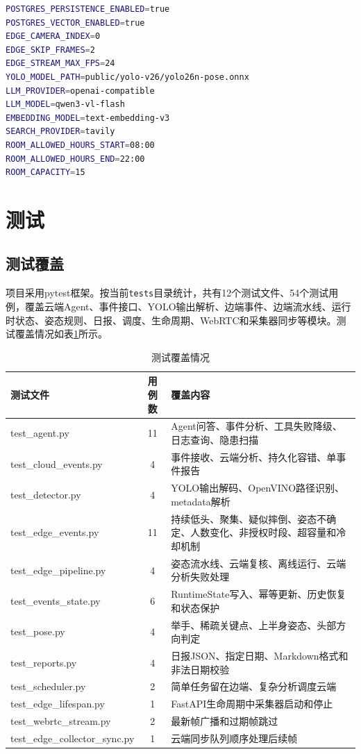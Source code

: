 \begin{lstlisting}[language=bash]
POSTGRES_PERSISTENCE_ENABLED=true
POSTGRES_VECTOR_ENABLED=true
EDGE_CAMERA_INDEX=0
EDGE_SKIP_FRAMES=2
EDGE_STREAM_MAX_FPS=24
YOLO_MODEL_PATH=public/yolo-v26/yolo26n-pose.onnx
LLM_PROVIDER=openai-compatible
LLM_MODEL=qwen3-vl-flash
EMBEDDING_MODEL=text-embedding-v3
SEARCH_PROVIDER=tavily
ROOM_ALLOWED_HOURS_START=08:00
ROOM_ALLOWED_HOURS_END=22:00
ROOM_CAPACITY=15
\end{lstlisting}

\section{测试}

\subsection{测试覆盖}

项目采用pytest框架。按当前\verb|tests|目录统计，共有12个测试文件、54个测试用例，覆盖云端Agent、事件接口、YOLO输出解析、边端事件、边端流水线、运行时状态、姿态规则、日报、调度、生命周期、WebRTC和采集器同步等模块。测试覆盖情况如表\ref{tb:test}所示。

\begin{table}[H]
\caption{测试覆盖情况}
\begin{center}
\begin{tabular}{lcp{7.5cm}}
\toprule
测试文件                       & 用例数 & 覆盖内容 \\
\midrule
test\_agent.py                 & 11 & Agent问答、事件分析、工具失败降级、日志查询、隐患扫描 \\
test\_cloud\_events.py          & 4  & 事件接收、云端分析、持久化容错、单事件报告 \\
test\_detector.py               & 4  & YOLO输出解码、OpenVINO路径识别、metadata解析 \\
test\_edge\_events.py           & 11 & 持续低头、聚集、疑似摔倒、姿态不确定、人数变化、非授权时段、超容量和冷却机制 \\
test\_edge\_pipeline.py         & 4  & 姿态流水线、云端复核、离线运行、云端分析失败处理 \\
test\_events\_state.py          & 6  & RuntimeState写入、幂等更新、历史恢复和状态保护 \\
test\_pose.py                   & 4  & 举手、稀疏关键点、上半身姿态、头部方向判定 \\
test\_reports.py                & 4  & 日报JSON、指定日期、Markdown格式和非法日期校验 \\
test\_scheduler.py              & 2  & 简单任务留在边端、复杂分析调度云端 \\
test\_edge\_lifespan.py         & 1  & FastAPI生命周期中采集器启动和停止 \\
test\_webrtc\_stream.py         & 2  & 最新帧广播和过期帧跳过 \\
test\_edge\_collector\_sync.py  & 1  & 云端同步队列顺序处理后续帧 \\
\bottomrule
\end{tabular}
\end{center}
\label{tb:test}
\end{table}

